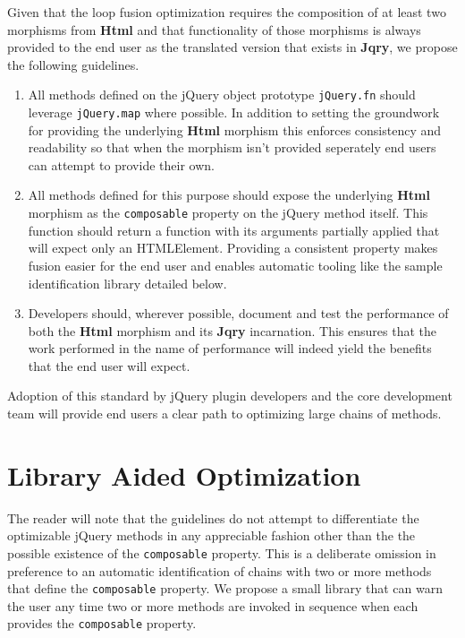 \documentclass[preprint]{sigplanconf}
\begin{document}
Given that the loop fusion optimization requires the composition of at least two morphisms from \textbf{Html} and that functionality of those morphisms is always provided to the end user as the translated version that exists in \textbf{Jqry}, we propose the following guidelines.

\begin{enumerate}
  \item \label{item:standard-1} All methods defined on the jQuery object prototype \verb|jQuery.fn| should leverage \verb|jQuery.map| where possible. In addition to setting the groundwork for providing the underlying \textbf{Html} morphism this enforces consistency and readability so that when the morphism isn't provided seperately end users can attempt to provide their own.
  \item \label{item:standard-2} All methods defined for this purpose should expose the underlying \textbf{Html} morphism as the \verb|composable| property on the jQuery method itself. This function should return a function with its arguments partially applied that will expect only an HTMLElement. Providing a consistent property makes fusion easier for the end user and enables automatic tooling like the sample identification library detailed below.
  \item \label{item:standard-3}Developers should, wherever possible, document and test the performance of both the \textbf{Html} morphism and its \textbf{Jqry} incarnation. This ensures that the work performed in the name of performance will indeed yield the benefits that the end user will expect.
\end{enumerate}

Adoption of this standard by jQuery plugin developers and the core development team will provide end users a clear path to optimizing large chains of methods.

\section{Library Aided Optimization} \label{sec:library-aided-optimization}

The reader will note that the guidelines do not attempt to differentiate the optimizable jQuery methods in any appreciable fashion other than the the possible existence of the \verb|composable| property. This is a deliberate omission in preference to an automatic identification of chains with two or more methods that define the \verb|composable| property. We propose a small library that can warn the user any time two or more methods are invoked in sequence when each provides the \verb|composable| property.
\end{document}
